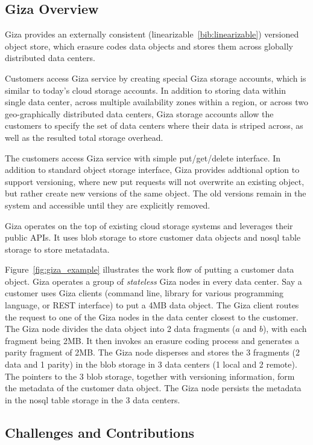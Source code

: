 \subsection{Giza Overview}

Giza provides an externally consistent (linearizable~\ref{bib:linearizable}) versioned object store, which erasure codes data objects and stores them across globally distributed data centers.

Customers access Giza service by creating special Giza storage accounts, which is similar to today's cloud storage accounts. In addition to storing data within single data center, across multiple availability zones within a region, or across two geo-graphically distributed data centers, Giza storage accounts allow the customers to specify the set of data centers where their data is striped across, as well as the resulted total storage overhead.

The customers access Giza service with simple put/get/delete interface. In addition to standard object storage interface, Giza provides addtional option to support versioning, where new put requests will not overwrite an existing object, but rather create new versions of the same object. The old versions remain in the system and accessible until they are explicitly removed.

Giza operates on the top of existing cloud storage systems and leverages their public APIs. It uses blob storage to store customer data objects and nosql table storage to store metatadata.

Figure~\ref{fig:giza_example} illustrates the work flow of putting a customer data object. Giza operates a group of {\em stateless} Giza nodes in every data center. Say a customer uses Giza clients (command line, library for various programming language, or REST interface) to put a 4MB data object. The Giza client routes the request to one of the Giza nodes in the data center closest to the customer. The Giza node divides the data object into 2 data fragments ($a$ and $b$), with each fragment being 2MB. It then invokes an erasure coding process and generates a parity fragment of 2MB. The Giza node disperses and stores the 3 fragments (2 data and 1 parity) in the blob storage in 3 data centers (1 local and 2 remote). The pointers to the 3 blob storage, together with versioning information, form the metadata of the customer data object. The Giza node persists the metadata in the nosql table storage in the 3 data centers.

\subsection{Challenges and Contributions}

